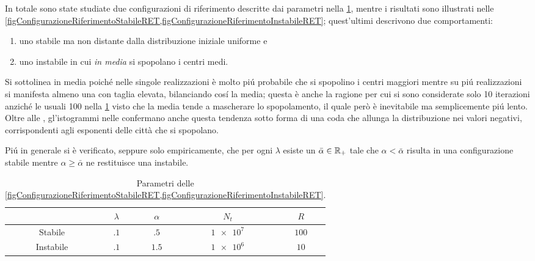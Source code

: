       In totale sono state studiate due configurazioni di riferimento descritte dai parametri nella \cref{tabParametriRegolaEmigrazioneTaglia}, mentre i risultati sono illustrati nelle \cref{figConfigurazioneRiferimentoStabileRET,figConfigurazioneRiferimentoInstabileRET}; quest'ultimi descrivono due comportamenti:

      \begin{enumerate}[
        label=\(\diamond\),
      ]
        \item uno stabile ma non distante dalla distribuzione iniziale uniforme e
        \item uno instabile in cui \textit{in media} si spopolano i centri medi.
      \end{enumerate}
      
      Si sottolinea in media poiché nelle singole realizzazioni è molto piú probabile che si spopolino i centri maggiori mentre su piú realizzazioni si manifesta almeno una con taglia elevata, bilanciando cosí la media; questa è anche la ragione per cui si sono considerate solo 10 iterazioni anziché le usuali 100 nella \cref{tabParametriRegolaEmigrazioneTaglia} visto che la media tende a mascherare lo spopolamento, il quale però è inevitabile ma semplicemente piú lento. Oltre alle , gl'istogrammi nelle  confermano anche questa tendenza sotto forma di una coda che allunga la distribuzione nei valori negativi, corrispondenti agli esponenti delle città che si spopolano.

      Piú in generale si è verificato, seppure solo empiricamente, che per ogni \(\lambda\) esiste un \(\bar\alpha\in\mathbb R_+\) tale che \(\alpha<\bar\alpha\) risulta in una configurazione stabile mentre \(\alpha\geq\bar\alpha\) ne restituisce una instabile.

      \begin{table}[tb]%
        \centering
        \caption{Parametri delle \cref{figConfigurazioneRiferimentoStabileRET,figConfigurazioneRiferimentoInstabileRET}.}
        \begin{tabular}{ccccc}
          \hline
          &\(\lambda\)&\(\alpha\)&\(N_t\)&\(R\)\\
          \hline
          Stabile&\(\num{.1}\)&\(\num{.5}\)&\(\num{1e7}\)&\(\num{100}\)\\
          Instabile&\(\num{.1}\)&\(\num{1.5}\)&\(\num{1e6}\)&\(\num{10}\)\\
          \hline
        \end{tabular}
        \label{tabParametriRegolaEmigrazioneTaglia}
      \end{table}

